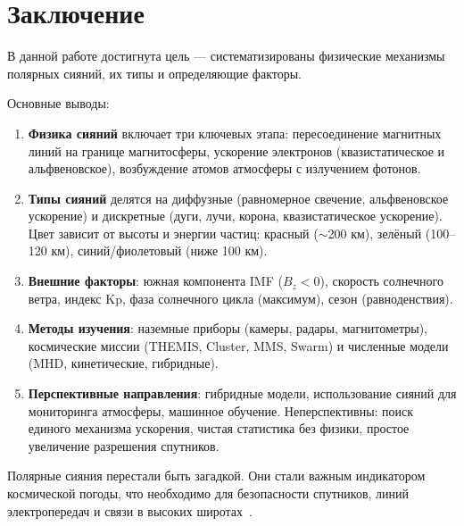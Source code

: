 \section*{Заключение}

В данной работе достигнута цель --- систематизированы физические механизмы полярных сияний, их типы и определяющие факторы.

Основные выводы:

\begin{enumerate}
    \item \textbf{Физика сияний} включает три ключевых этапа: пересоединение магнитных линий на границе магнитосферы, ускорение электронов (квазистатическое и альфвеновское), возбуждение атомов атмосферы с излучением фотонов.
    
    \item \textbf{Типы сияний} делятся на диффузные (равномерное свечение, альфвеновское ускорение) и дискретные (дуги, лучи, корона, квазистатическое ускорение). Цвет зависит от высоты и энергии частиц: красный ($\sim$200 км), зелёный (100--120 км), синий/фиолетовый (ниже 100 км).
    
    \item \textbf{Внешние факторы}: южная компонента IMF ($B_z<0$), скорость солнечного ветра, индекс Kp, фаза солнечного цикла (максимум), сезон (равноденствия).
    
    \item \textbf{Методы изучения}: наземные приборы (камеры, радары, магнитометры), космические миссии (THEMIS, Cluster, MMS, Swarm) и численные модели (MHD, кинетические, гибридные).
    
    \item \textbf{Перспективные направления}: гибридные модели, использование сияний для мониторинга атмосферы, машинное обучение. Неперспективны: поиск единого механизма ускорения, чистая статистика без физики, простое увеличение разрешения спутников.
\end{enumerate}

Полярные сияния перестали быть загадкой. Они стали важным индикатором космической погоды, что необходимо для безопасности спутников, линий электропередач и связи в высоких широтах~\cite{kivelson1995, pasachoff2013}.